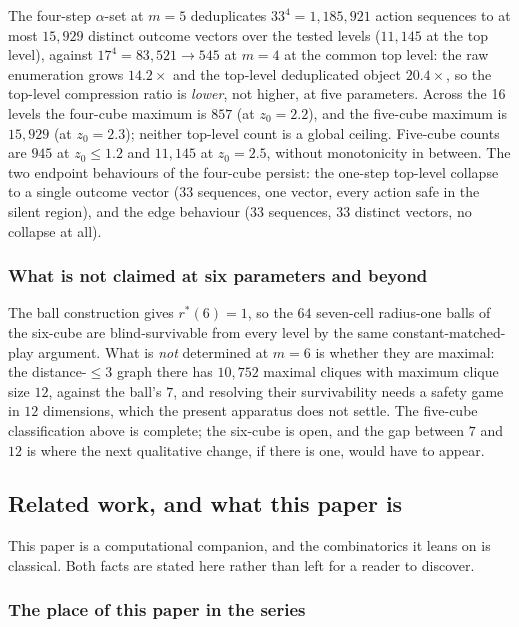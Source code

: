 \documentclass[10pt,twocolumn]{article}
\theoremstyle{plain}
\theoremstyle{definition}
\theoremstyle{remark}
\begin{document}
The four-step \(\alpha\)-set at \(m = 5\) deduplicates \(33^{4} = 1{,}185{,}921\) action
sequences to at most \(15{,}929\) distinct outcome vectors over the tested levels
(\(11{,}145\) at the top level), against
\(17^{4} = 83{,}521 \to 545\) at \(m = 4\) at the common top level: the raw
enumeration grows \(14.2\times\) and the top-level deduplicated object
\(20.4\times\), so the top-level compression ratio is \emph{lower}, not
higher, at five parameters. Across the 16 levels the four-cube maximum
is \(857\) (at \(z_0=2.2\)), and the five-cube maximum is
\(15{,}929\) (at \(z_0=2.3\)); neither top-level count is a
global ceiling. Five-cube counts are \(945\) at \(z_0\le1.2\)
and \(11{,}145\) at \(z_0=2.5\), without monotonicity in between. The two endpoint behaviours of the four-cube persist: the
one-step top-level collapse to a single outcome vector (\(33\) sequences, one vector, every
action safe in the silent region), and the edge behaviour (\(33\) sequences, \(33\) distinct
vectors, no collapse at all).

\subsubsection{What is not claimed at six parameters and beyond}

The ball construction gives \(r^{*}(6) = 1\), so the \(64\) seven-cell radius-one balls of
the six-cube are blind-survivable from every level by the same constant-matched-play
argument. What is \emph{not} determined at \(m = 6\) is whether they are maximal: the
distance-\(\le 3\) graph there has \(10{,}752\) maximal cliques with maximum clique size
\(12\), against the ball's \(7\), and resolving their survivability needs a safety game in
\(12\) dimensions, which the present apparatus does not settle. The five-cube classification
above is complete; the six-cube is open, and the gap between \(7\) and \(12\) is where the
next qualitative change, if there is one, would have to appear.

\subsection{Related work, and what this paper is}
\label{scale-priorart}

This paper is a computational companion, and the combinatorics it leans on is classical.
Both facts are stated here rather than left for a reader to discover.

\subsubsection{The place of this paper in the series}
\end{document}
